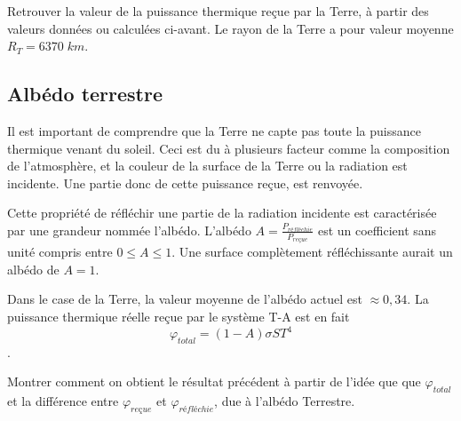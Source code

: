\documentclass[11pt,a4paper]{article}
\begin{document}
\begin{exo}
Retrouver la valeur de la puissance thermique reçue par la Terre, à partir des valeurs données ou calculées ci-avant. Le rayon de la Terre a pour valeur moyenne $R_T=6370\; km$.
\vspace{6cm}
\end{exo}

\subsection{Albédo terrestre}
Il est important de comprendre que la Terre ne capte pas toute la puissance thermique venant du soleil. Ceci est du à plusieurs facteur comme la composition de l'atmosphère, et la couleur de la surface de la Terre ou la radiation est incidente. Une partie donc de cette puissance reçue, est renvoyée. 

Cette propriété de réfléchir une partie de la radiation incidente est caractérisée par une grandeur nommée l'albédo. L'albédo $A=\frac{P_{réfléchie}}{P_{reçue}}$ est un coefficient sans unité compris entre $0\leq A\leq 1$. Une surface complètement réfléchissante aurait un albédo de $A=1$. 

Dans le case de la Terre, la valeur moyenne de l'albédo actuel est $\approx0,34$. La puissance thermique réelle reçue par le système T-A est en fait \[  \varphi_{total} =\left(1-A\right)\sigma S T^4 \]. 

\begin{exo}
Montrer comment on obtient le résultat précédent à partir de l'idée que que $\varphi_{total}$ et la différence entre $\varphi_{reçue}$ et $\varphi_{réfléchie}$, due à l'albédo Terrestre. 
\vspace{4.5cm}
\end{exo}
\end{document}
